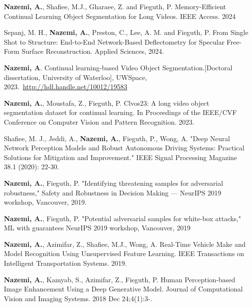 \documentclass[letterpaper,11pt]{article}
\begin{document}
    \item {\textbf {Nazemi, A.}, Shafiee, M.J., Gharaee, Z. and Fieguth, P. Memory-Efficient Continual Learning Object Segmentation for Long Videos. IEEE Access. 2024}

    \item {Sepanj, M. H., \textbf {Nazemi, A.}, Preston, C., Lee, A. M. and Fieguth, P. From Single Shot to Structure: End-to-End Network-Based Deflectometry for Specular Free-Form Surface Reconstruction. Applied Sciences, 2024.}

    \item {\textbf {Nazemi, A}. Continual learning-based Video Object Segmentation.[Doctoral dissertation, University of Waterloo], UWSpace, 2023.~\href{http://hdl.handle.net/10012/19583}{\underline{http://hdl.handle.net/10012/19583}}}

    \item{\textbf {Nazemi, A.}, Moustafa, Z., Fieguth, P. Clvos23: A long video object segmentation dataset for continual learning. In Proceedings of the IEEE/CVF Conference on Computer Vision and Pattern Recognition. 2023.}

    \item{Shafiee, M. J., Jeddi, A., \textbf {Nazemi, A.}, Fieguth, P., Wong, A. "Deep Neural Network Perception Models and Robust Autonomous Driving Systems: Practical Solutions for Mitigation and Improvement." IEEE Signal Processing Magazine 38.1 (2020): 22-30.}

    \item{\textbf {Nazemi, A.}, Fieguth, P. "Identifying threatening samples for adversarial robustness," Safety and Robustness in Decision Making — NeurIPS 2019 workshop, Vancouver, 2019.}

    \item{\textbf {Nazemi, A.}, Fieguth, P. "Potential adversarial samples for white-box attacks," ML with guarantees NeurIPS 2019 workshop, Vancouver, 2019}

    \item{\textbf {Nazemi, A.}, Azimifar, Z., Shafiee, M.J., Wong, A. Real-Time Vehicle Make and Model Recognition Using Unsupervised Feature Learning. IEEE Transactions on Intelligent Transportation Systems. 2019.}

    \item{\textbf {Nazemi, A.}, Kamyab, S., Azimifar, Z., Fieguth, P. Human Perception-based Image Enhancement Using a Deep Generative Model. Journal of Computational Vision and Imaging Systems. 2018 Dec 24;4(1):3-.}
\end{document}
